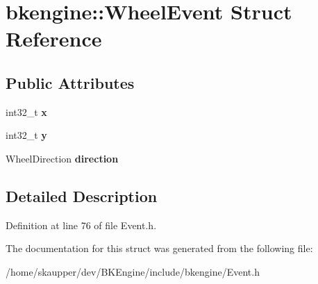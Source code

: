 \hypertarget{structbkengine_1_1WheelEvent}{}\section{bkengine\+:\+:Wheel\+Event Struct Reference}
\label{structbkengine_1_1WheelEvent}
\subsection*{Public Attributes}
\begin{DoxyCompactItemize}
\item 
\mbox{\label{structbkengine_1_1WheelEvent_a8dff42b278014781dcfea71e45fc10e8}} 
int32\+\_\+t {\bfseries x}
\item 
\mbox{\label{structbkengine_1_1WheelEvent_ad4cecaa9119eef57325a503ce0746eff}} 
int32\+\_\+t {\bfseries y}
\item 
\mbox{\label{structbkengine_1_1WheelEvent_adafbc85c70ddf5cc485c2dd1228d8801}} 
Wheel\+Direction {\bfseries direction}
\end{DoxyCompactItemize}


\subsection{Detailed Description}


Definition at line 76 of file Event.\+h.



The documentation for this struct was generated from the following file\+:\begin{DoxyCompactItemize}
\item 
/home/skaupper/dev/\+B\+K\+Engine/include/bkengine/Event.\+h\end{DoxyCompactItemize}
